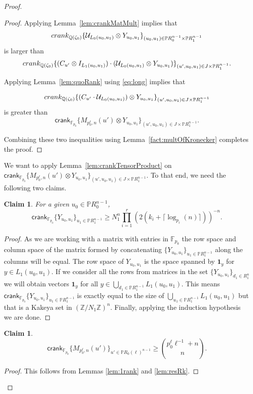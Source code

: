 \documentclass[11pt]{article}
\numberwithin{equation}{section}
\newtheorem{claim}[thm]{Claim}
\def\F{{\mathbb{F}}}
\def\Q{{\mathbb{Q}}}
\def\Z{{\mathbb{Z}}}
\def\P{{\mathbb{P}}}
\def\cU{{\cal U}}
\def\Ind{{\mathbf{1}}}
\def\crank{\textsf{crank}}
\begin{document}
\begin{proof}
\begin{proof}
Applying Lemma~\ref{lem:crankMatMult} implies that
$$\crank_{\Q(\zeta_0)} \{\cU_{L_{0}(u_0,u_1)}\otimes Y_{u_0,u_1}\}_{(u_0,u_1)\in \P R_0^{n-1}\times \P R_1^{n-1}}$$
is larger than 
$$\crank_{\Q(\zeta_0)} \{(C_{u'}\otimes I_{L_1(u_0,u_1)})\cdot (\cU_{L_{0}(u_0,u_1)}\otimes Y_{u_0,u_1})\}_{(u',u_0,u_1)\in J\times \P R_1^{n-1}}.$$

Applying Lemma~\ref{lem:quoRank} using \eqref{eq:long} implies that 

$$\crank_{\Q(\zeta_0)} \{(C_{u'}\cdot \cU_{L_{0}(u_0,u_1)})\otimes Y_{u_0,u_1}\}_{(u',u_0,u_1)\in J\times \P R_1^{n-1}} $$
is greater than
$$\crank_{\F_{p_0}} \{M_{p_0^{\ell},n}(u')\otimes Y_{u_0,u_1}\}_{(u',u_0,u_1)\in J\times \P R_1^{n-1}}. $$

Combining these two inequalities using Lemma~\ref{fact:multOfKronecker} completes the proof.
\end{proof}

We want to apply Lemma~\ref{lem:crankTensorProduct} on $\crank_{\F_{p_0}} \{M_{p_0^{\ell},n}(u')\otimes Y_{u_0,u_1}\}_{(u',u_0,u_1)\in J\times \P R_1^{n-1}}$. To that end, we need the following two claims.

\begin{claim}
For a given $u_0 \in \P R_0^{n-1}$,
{\em $$\crank_{\F_{p_0}} \{Y_{u_0,u_1}\}_{u_1\in \P R_1^{n-1}} \ge N_1^n\prod\limits_{i=1}^r (2(k_i+\lceil \log_{p_i}(n)\rceil))^{-n}.$$}
\end{claim}
\begin{proof}
As we are working with a matrix with entries in $\F_{p_0}$ the row space and column space of the matrix formed by concatenating $\{Y_{u_0,u_1}\}_{u_1\in \P R_1^{n-1}}$ along the columns will be equal. The row space of $Y_{u_0,u_1}$ is the space spanned by $\Ind_y$ for $y\in L_1(u_0,u_1)$. If we consider all the rows from matrices in the set $\{Y_{u_0,u_1}\}_{d_1\in R_1^n}$ we will obtain vectors $\Ind_y$ for all $y \in \bigcup_{d_1\in  \P R_1^{n-1}} L_1(u_0,u_1)$. 
This means $\crank_{\F_{p_0}} \{Y_{u_0,u_1}\}_{u_1\in \P R_1^{n-1}}$ is exactly equal to the size of $\bigcup_{u_1\in \P R_1^{n-1}} L_1(u_0,u_1)$ but that is a Kakeya set in $(\Z/N_1\Z)^n$. Finally, applying the induction hypothesis we are done.
\end{proof}

\begin{claim}
{\em$$\crank_{\F_{p_0}} \{M_{p_0^{\ell},n}(u')\}_{u'\in \P R_0(\ell)^{n-1}} \ge \binom{p_0^\ell \ell^{-1}+n}{n}.$$}
\end{claim}
\begin{proof}
This follows from Lemmas \ref{lem:1rank} and \ref{lem:resRk}.
\end{proof}


\end{proof}
\end{document}
